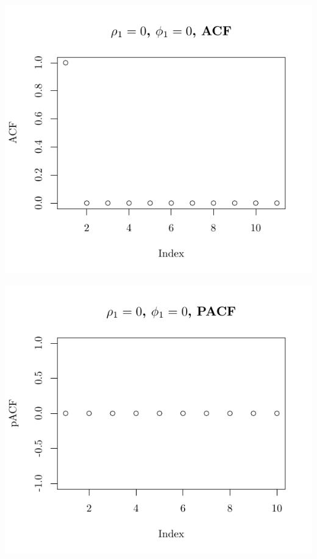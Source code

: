 \documentclass[10pt]{paper}\usepackage[]{graphicx}\usepackage[]{color}
\makeatletter
\def\maxwidth{ %
  \ifdim\Gin@nat@width>\linewidth
    \linewidth
  \else
    \Gin@nat@width
  \fi
}
\newenvironment{knitrout}{}{} %
\makeatother
\begin{document}
\begin{knitrout}
{\centering \includegraphics[width=\maxwidth]{figure/graphics-plotter-13} 

}




{\centering \includegraphics[width=\maxwidth]{figure/graphics-plotter-14} 

}





\end{knitrout}
\end{document}
